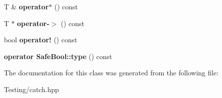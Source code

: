 \begin{DoxyCompactItemize}
\item 
\hypertarget{class_catch_1_1_ptr_a3a4c139032a8bd1bffa553103d5dbfd3}{T \& {\bfseries operator$\ast$} () const }\label{class_catch_1_1_ptr_a3a4c139032a8bd1bffa553103d5dbfd3}

\item 
\hypertarget{class_catch_1_1_ptr_afaa13250d5e0ae5a440726d5e5aa7295}{T $\ast$ {\bfseries operator-\/$>$} () const }\label{class_catch_1_1_ptr_afaa13250d5e0ae5a440726d5e5aa7295}

\item 
\hypertarget{class_catch_1_1_ptr_aea1a99ded6d62423ccb9173fab91b56e}{bool {\bfseries operator!} () const }\label{class_catch_1_1_ptr_aea1a99ded6d62423ccb9173fab91b56e}

\item 
\hypertarget{class_catch_1_1_ptr_a27234c04feec43ffe0fd08e045557448}{{\bfseries operator Safe\-Bool\-::type} () const }\label{class_catch_1_1_ptr_a27234c04feec43ffe0fd08e045557448}

\end{DoxyCompactItemize}


The documentation for this class was generated from the following file\-:\begin{DoxyCompactItemize}
\item 
Testing/catch.\-hpp\end{DoxyCompactItemize}
